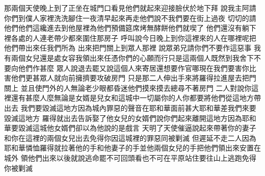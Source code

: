 \bchapter%
那兩個天使晚上到了\yuentien{}正坐在城門口\yuentien 看見他們\chientien 就起來迎接\chientien 臉伏於地下拜\chientien 
{}說\chientien 我主阿\chientien 請你們到僕人家裡洗洗腳\chientien 住一夜\chientien 清早起來再走\yuentien 他們說\chientien 不\chientien 我們要在街上過夜\chuan 
{}切切的請他們\chientien 他們這纔進去到他屋裡\yuentien{}為他們預備筵席\chientien 烤無酵餅\chientien 他們就喫了\chuan 
{}他們還沒有躺下\chientien{}裡各處的人\chientien 連老帶少\chientien 都來圍住那房子\yuentien 
{}呼叫說\chientien 今日晚上到你這裡來的人在哪裡呢\yuentien 把他們帶出來\chientien 任我們所為\chuan 
{}出來\chientien 把門關上\chientien 到眾人那裡\chientien 
{}說\chientien 眾弟兄請你們不要作這惡事\chuan 
{}我有兩個女兒\chientien 還是處女\chientien 容我領出來任憑你們的心願而行\chientien 只是這兩個人既然到我舍下\chientien 不要向他們作甚麼\chuan 
{}眾人說\chientien 退去罷\yuentien 又說\chientien 這個人來寄居\chientien 還想要作官哪\yuentien 現在我們要害你比害他們更甚\chientien 眾人就向前擁擠\chientien 要攻破房門\chuan 
{}只是那二人伸出手來\chientien 將羅得拉進屋去\chientien 把門關上\yuentien 
{}並且使門外的人\chientien 無論老少\chientien 眼都昏迷\yuentien 他們摸來摸去\chientien 總尋不著房門\chuan\Chuan
{}二人對說\chientien 你這裡還有甚麼人麼\yuentien 無論是女婿\chientien 是兒女\chientien 和這城中一切屬你的人\chientien 你都要將他們從這地方帶出去\chuan 
{}我們要毀滅這地方\chientien 因為城內罪惡的聲音\chientien 在耶和華面前甚大\chientien 耶和華差我們來\chientien 要毀滅這地方\chuan 
{}羅得就出去\chientien 告訴娶了他女兒的女婿們\chientien{}\hss\linebreak{}說\chientien 你們起來離開這地方\chientien 因為耶和華要毀滅這城\yuentien 他女婿們卻以為他說的是戲言\chuan 
{}天明了\chientien 天使催逼說\chientien 起來\chientien 帶著你的妻子\chientien 和你在這裡的兩個女兒出去\chientien 免得你因這城裡的罪惡\chientien 同被剿滅\chuan 
{}但遲延不走\yuentien 二人因為耶和華憐恤羅得\chientien 就拉著他的手\chientien 和他妻子的手\chientien 並他兩個女兒的手\chientien 把他們領出來\chientien 安置在城外\chuan 
{}領他們出來以後\chientien 就說\chientien 逃命罷\yuentien 不可回頭看\chientien 也不可在平原站住\chientien 要往山上逃跑\chientien 免得你被剿滅\chuan 
